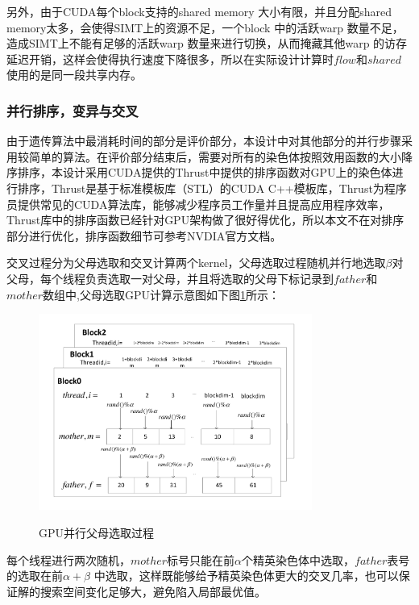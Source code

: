 另外，由于CUDA每个block支持的shared memory 大小有限，并且分配shared memory太多，会使得SIMT上的资源不足，一个block 中的活跃warp 数量不足，造成SIMT上不能有足够的活跃warp 数量来进行切换，从而掩藏其他warp 的访存延迟开销，这样会使得执行速度下降很多，所以在实际设计计算时$flow$和$shared$使用的是同一段共享内存。
\subsubsection{并行排序，变异与交叉}
由于遗传算法中最消耗时间的部分是评价部分，本设计中对其他部分的并行步骤采用较简单的算法。在评价部分结束后，需要对所有的染色体按照效用函数的大小降序排序，本设计采用CUDA提供的Thrust中提供的排序函数对GPU上的染色体进行排序，Thrust是基于标准模板库（STL）的CUDA C++模板库，Thrust为程序员提供常见的CUDA算法库，能够减少程序员工作量并且提高应用程序效率，Thrust库中的排序函数已经针对GPU架构做了很好得优化，所以本文不在对排序部分进行优化，排序函数细节可参考NVDIA官方文档。

交叉过程分为父母选取和交叉计算两个kernel，父母选取过程随机并行地选取$\beta$对父母，每个线程负责选取一对父母，并且将选取的父母下标记录到$father$和$mother$数组中,父母选取GPU计算示意图如下图\ref{pp}所示：
\begin{figure}
\begin{center}
{\includegraphics[width=0.8\textwidth]{figures/GPUchoose.pdf}}
\end{center}
\caption{{\footnotesize{GPU并行父母选取过程}}}
\label{pp}
\end{figure}
每个线程进行两次随机，$mother$标号只能在前$\alpha$个精英染色体中选取，$father$表号的选取在前$\alpha+\beta$ 中选取，这样既能够给予精英染色体更大的交叉几率，也可以保证解的搜索空间变化足够大，避免陷入局部最优值。

